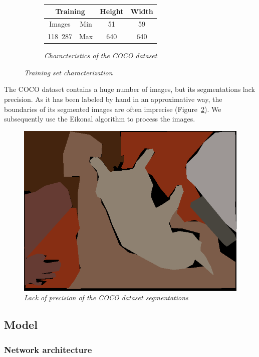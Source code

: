 \documentclass{article}
\begin{document}
\begin{figure}[!ht]
\begin{subfigure}{.49\linewidth}
\begin{tabular}{|c||c|c|c|}
                    \hline
                    \multicolumn{2}{|c|}{Training} & Height & Width \\
                    \hline
                    \hline
                    Images & Min & 51 & 59 \\
                    \hline
                    118~287 & Max & 640 & 640 \\
                    \hline
                \end{tabular}
                \caption{\textit{Characteristics of the COCO dataset}}
            \end{subfigure}
            \caption{\textit{Training set characterization}}
            \label{fig:train}
        \end{figure}

        The COCO dataset contains a huge number of images, but its segmentations lack precision. As it has been labeled by hand in an approximative way, the boundaries of its segmented images are often imprecise (Figure~\ref{fig:imprecise}). We subsequently use the Eikonal algorithm to process the images.

        \begin{figure}[!ht]
            \centering
            \includegraphics[width=0.3\linewidth]{pics/img_segm_coco.png}
            \caption{\textit{Lack of precision of the COCO dataset segmentations}}
            \label{fig:imprecise}
        \end{figure}


    \subsection{Model}

        \subsubsection{Network architecture}
\end{document}
